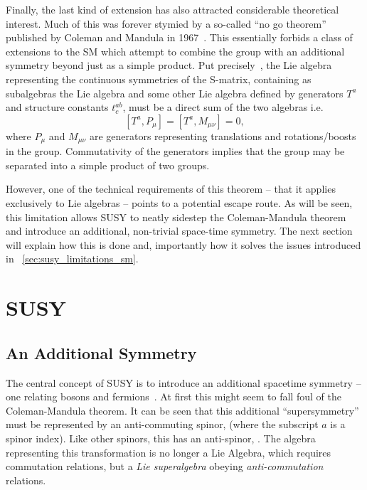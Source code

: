 Finally, the last kind of extension has also attracted considerable theoretical
interest. Much of this was forever stymied by a so-called ``no go theorem''
published by Coleman and Mandula in 1967~\cite{coleman_mandula}. This
essentially forbids a class of extensions to the \ac{SM} which attempt to
combine the \Poincare group with an additional symmetry beyond just as a simple
product. Put precisely~\cite{sparticles}, the Lie algebra representing the
continuous symmetries of the S-matrix, containing as subalgebras the \Poincare
Lie algebra and some other Lie algebra defined by generators $T^a$ and structure
constants $t^{ab}_c$, must be a direct sum of the two algebras i.e.
\begin{equation*}
\left[T^a, P_{\mu}\right] = \left[T^a, M_{\mu\nu}\right] = 0,
\end{equation*}
where $P_{\mu}$ and $M_{\mu\nu}$ are generators representing translations and
rotations/boosts in the \Poincare group. Commutativity of the generators implies
that the group may be separated into a simple product of two groups.

However, one of the technical requirements of this theorem -- that it applies
exclusively to Lie algebras -- points to a potential escape route. As will be
seen, this limitation allows \acf{SUSY} to neatly sidestep the Coleman-Mandula
theorem and introduce an additional, non-trivial space-time symmetry. The next
section will explain how this is done and, importantly how it solves the issues
introduced in \sec~\ref{sec:susy_limitations_sm}.

\section{\acl{SUSY}}
\subsection{An Additional Symmetry}
The central concept of \ac{SUSY} is to introduce an additional spacetime
symmetry -- one relating bosons and fermions~\cite{sparticles}. At first this
might seem to fall foul of the Coleman-Mandula theorem. It can be seen that this
additional ``supersymmetry'' must be represented by an anti-commuting spinor, \Qa
(where the subscript $a$ is a spinor index). Like other spinors, this has an
anti-spinor, \AQa. The algebra representing this transformation is no longer a
Lie Algebra, which requires commutation relations, but a \emph{Lie superalgebra}
obeying \emph{anti-commutation} relations.

